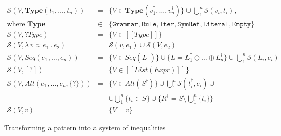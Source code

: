 \documentclass{IOS-Book-Article}     %
\newcommand{\abstr}[3]{\lambda \, #1 \approx #2 \,.\, #3}
\newcommand{\sem}[1]{[\![#1]\!]}
\newcommand{\fresh}[1]{#1^\dagger}
\newcommand{\Eq}{\mathcal{S}}
\begin{document}
\begin{figure}%
\centering%
$
\begin{array}{rcl}
\Eq(V, \mathbf{Type}(t_1, \ldots, t_n)) &=& \{V \in \mathbf{Type}(\fresh{v_1}, \ldots, \fresh{v_n})\} \cup 
\bigcup_1^n \Eq{}(v_i, t_i),\\
\mbox{where } \mathbf{Type} &\in& \{
	\mathtt{Grammar}, \mathtt{Rule}, \mathtt{Iter}, \mathtt{SymRef}, \mathtt{Literal}, \mathtt{Empty}\}\\

\Eq{}(V, ?Type) &=& \{V \in \sem{Type}\}\\

\Eq{}(V, \abstr{v}{e_1}{e_2}) &=& \Eq{}(v, e_1) \cup \Eq{}(V, e_2)\\

\Eq{}(V, Seq(e_1, \ldots, e_n)) &=& \{V \in Seq(\fresh{L})\} \cup \{ L = \fresh{L_1} \oplus \ldots \oplus \fresh{L_n}\} \cup \bigcup_1^n \Eq{}(L_i, e_i)\\

\Eq{}(V, [?]) &=& \{ V \in \sem{List(Expr)} \}\\

\Eq{}(V, Alt(e_1, \ldots, e_n, \{?\})) &=& \{V \in Alt(\fresh{S})\}
                                   \cup \bigcup_1^n \Eq{}(\fresh{t_i}, e_i) \cup \\
                               &&    
                                   \cup \bigcup_1^n \{ t_i \in S\}
                                   \cup \{ \fresh{R} = S \setminus
                                                          \bigcup_1^n\{t_i\}\}\\
\Eq{}(V, v) &=& \{V = v\}
\end{array}
$
\caption{Transforming a pattern into a system of inequalities}\label{Eq}%
\end{figure}%
\end{document}
